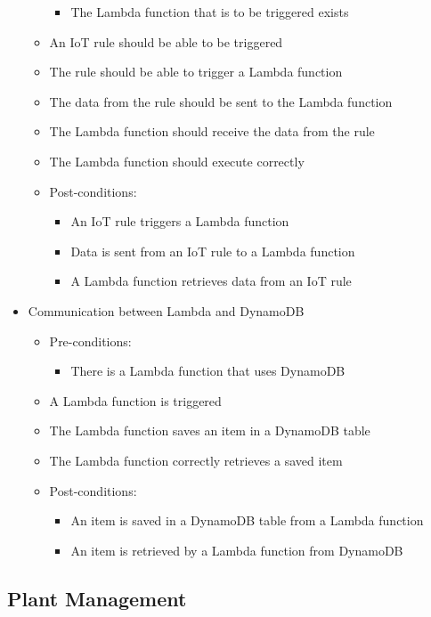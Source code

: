 \documentclass{article}
\begin{document}
\begin{itemize}
\begin{itemize}
\begin{itemize}
							\item The Lambda function that is to be triggered exists
						\end{itemize}
						\item An IoT rule should be able to be triggered
						\item The rule should be able to trigger a Lambda function
						\item The data from the rule should be sent to the Lambda function 
						\item The Lambda function should receive the data from the rule
						\item The Lambda function should execute correctly
						\item Post-conditions:
						\begin{itemize}
							\item An IoT rule triggers a Lambda function
							\item Data is sent from an IoT rule to a Lambda function
							\item A Lambda function retrieves data from an IoT rule
						\end{itemize}
					\end{itemize}
					
					\item{Communication between Lambda and DynamoDB}
					\begin{itemize}
						\item Pre-conditions: 
						\begin{itemize}
							\item There is a Lambda function that uses DynamoDB
						\end{itemize}
						\item A Lambda function is triggered
						\item The Lambda function saves an item in a DynamoDB table
						\item The Lambda function correctly retrieves a saved item
						\item Post-conditions:
						\begin{itemize}
							\item An item is saved in a DynamoDB table from a Lambda function
							\item An item is retrieved by a Lambda function from DynamoDB
						\end{itemize}
					\end{itemize}
				\end{itemize}
				
	\subsection{Plant Management}
\end{document}
